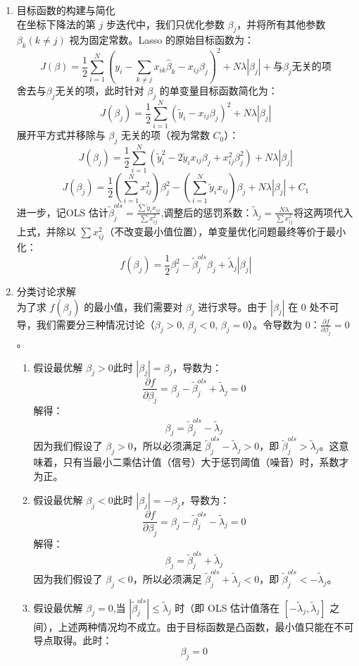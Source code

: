 \documentclass[11pt, a4paper]{article}
\begin{document}
\begin{enumerate}
    \item 目标函数的构建与简化\\ 在坐标下降法的第 $j$ 步迭代中，我们只优化参数 $\beta_j$，并将所有其他参数 $\beta_k (k \neq j)$ 视为固定常数。Lasso 的原始目标函数为：$$J(\beta) = \frac{1}{2}\sum_{i=1}^{N}(y_i - \sum_{k \neq j}x_{ik}\hat{\beta}_k - x_{ij}\beta_j)^2 + N\lambda|\beta_j| + \text{与$\beta_j$无关的项}$$
    舍去与$\beta_j$无关的项，此时针对 $\beta_j$ 的单变量目标函数简化为：$$J(\beta_j) = \frac{1}{2}\sum_{i=1}^{N}(\tilde{y}_i - x_{ij}\beta_j)^2 + N\lambda|\beta_j|$$展开平方式并移除与 $\beta_j$ 无关的项（视为常数 $C_0$）：$$J(\beta_j) = \frac{1}{2}\sum_{i=1}^{N}(\tilde{y}_i^2 - 2\tilde{y}_i x_{ij}\beta_j + x_{ij}^2 \beta_j^2) + N\lambda|\beta_j|$$$$J(\beta_j) = \frac{1}{2} (\sum_{i=1}^{N} x_{ij}^2) \beta_j^2 - (\sum_{i=1}^{N} \tilde{y}_i x_{ij}) \beta_j + N\lambda|\beta_j| + C_1$$进一步，记OLS 估计$\tilde{\beta}_j^{ols} = \frac{\sum \tilde{y}_i x_{ij}}{\sum x_{ij}^2}$,调整后的惩罚系数：$\tilde{\lambda}_j = \frac{N\lambda}{\sum x_{ij}^2}$将这两项代入上式，并除以 $\sum x_{ij}^2$（不改变最小值位置），单变量优化问题最终等价于最小化：$$f(\beta_j) = \frac{1}{2}\beta_j^2 - \tilde{\beta}_j^{ols}\beta_j + \tilde{\lambda}_j|\beta_j|$$
    \item 分类讨论求解\\为了求 $f(\beta_j)$ 的最小值，我们需要对 $\beta_j$ 进行求导。由于 $|\beta_j|$ 在 0 处不可导，我们需要分三种情况讨论（$\beta_j > 0$, $\beta_j < 0$, $\beta_j = 0$）。令导数为 0：$\frac{\partial f}{\partial \beta_j} = 0$。\begin{enumerate}
        \item 假设最优解 $\beta_j > 0$此时 $|\beta_j| = \beta_j$，导数为：$$\frac{\partial f}{\partial \beta_j} = \beta_j - \tilde{\beta}_j^{ols} + \tilde{\lambda}_j = 0$$解得：$$\beta_j = \tilde{\beta}_j^{ols} - \tilde{\lambda}_j$$因为我们假设了 $\beta_j > 0$，所以必须满足 $\tilde{\beta}_j^{ols} - \tilde{\lambda}_j > 0$，即 $\tilde{\beta}_j^{ols} > \tilde{\lambda}_j$。这意味着，只有当最小二乘估计值（信号）大于惩罚阈值（噪音）时，系数才为正。
        \item 假设最优解 $\beta_j < 0$此时 $|\beta_j| = -\beta_j$，导数为：$$\frac{\partial f}{\partial \beta_j} = \beta_j - \tilde{\beta}_j^{ols} - \tilde{\lambda}_j = 0$$解得：$$\beta_j = \tilde{\beta}_j^{ols} + \tilde{\lambda}_j$$因为我们假设了 $\beta_j < 0$，所以必须满足 $\tilde{\beta}_j^{ols} + \tilde{\lambda}_j < 0$，即 $\tilde{\beta}_j^{ols} < -\tilde{\lambda}_j$。
        \item 假设最优解 $\beta_j = 0$,当 $|\tilde{\beta}_j^{ols}| \le \tilde{\lambda}_j$ 时（即 OLS 估计值落在 $[-\tilde{\lambda}_j, \tilde{\lambda}_j]$ 之间），上述两种情况均不成立。由于目标函数是凸函数，最小值只能在不可导点取得。此时：$$\beta_j = 0$$

\end{enumerate}
\end{enumerate}
\end{document}
